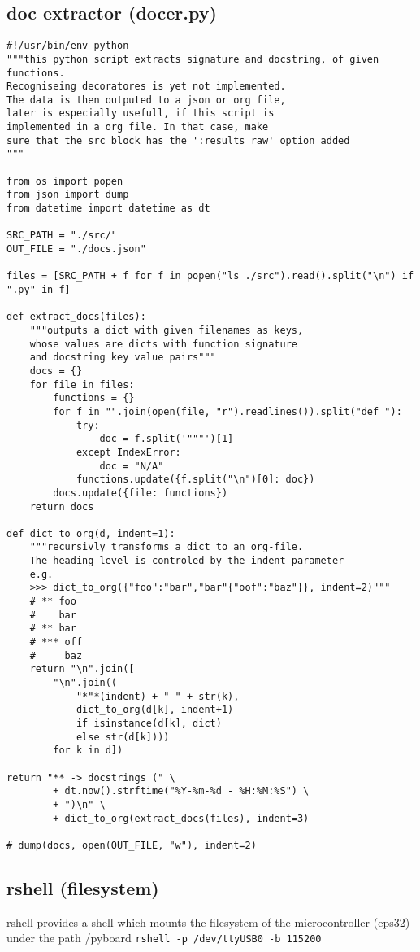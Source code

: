 \documentclass[11pt]{article}
\begin{document}
\subsection{doc extractor (docer.py)}
\label{sec:orgfa380a2}
\begin{verbatim}
#!/usr/bin/env python
"""this python script extracts signature and docstring, of given functions.
Recogniseing decoratores is yet not implemented.
The data is then outputed to a json or org file,
later is especially usefull, if this script is
implemented in a org file. In that case, make
sure that the src_block has the ':results raw' option added
"""

from os import popen
from json import dump
from datetime import datetime as dt

SRC_PATH = "./src/"
OUT_FILE = "./docs.json"

files = [SRC_PATH + f for f in popen("ls ./src").read().split("\n") if ".py" in f]

def extract_docs(files):
    """outputs a dict with given filenames as keys,
    whose values are dicts with function signature
    and docstring key value pairs"""
    docs = {}
    for file in files:
        functions = {}
        for f in "".join(open(file, "r").readlines()).split("def "):
            try:
                doc = f.split('"""')[1]
            except IndexError:
                doc = "N/A"
            functions.update({f.split("\n")[0]: doc})
        docs.update({file: functions})
    return docs

def dict_to_org(d, indent=1):
    """recursivly transforms a dict to an org-file.
    The heading level is controled by the indent parameter
    e.g.
    >>> dict_to_org({"foo":"bar","bar"{"oof":"baz"}}, indent=2)"""
    # ** foo
    #    bar
    # ** bar
    # *** off
    #     baz
    return "\n".join([
        "\n".join((
            "*"*(indent) + " " + str(k),
            dict_to_org(d[k], indent+1)
            if isinstance(d[k], dict)
            else str(d[k])))
        for k in d])

return "** -> docstrings (" \
        + dt.now().strftime("%Y-%m-%d - %H:%M:%S") \
        + ")\n" \
        + dict_to_org(extract_docs(files), indent=3)

# dump(docs, open(OUT_FILE, "w"), indent=2)
\end{verbatim}
\subsection{rshell (filesystem)}
\label{sec:org4044702}
rshell provides a shell which mounts the
filesystem of the microcontroller (eps32)
under the path /pyboard
\texttt{rshell -p /dev/ttyUSB0 -b 115200}
\end{document}
